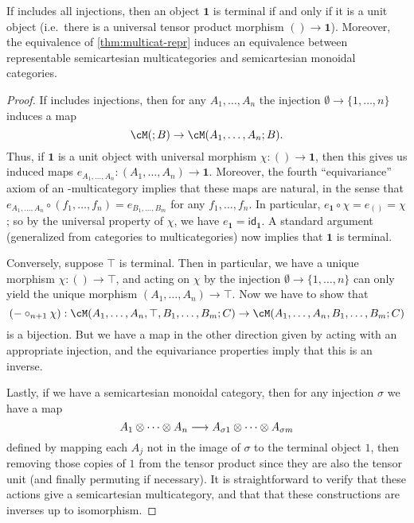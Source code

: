 \documentclass{book}
\def\idfunc{\mathsf{id}}
\def\unit{\top}%
\def\one{\mathbf{1}}
\let\tensor\otimes
\begin{document}
\begin{thm}\label{thm:semicart-multicat-repr}
  If \fS includes all injections, then an object $\one$ is terminal if and only if it is a unit object (i.e.\ there is a universal tensor product morphism $()\to \one$).
  Moreover, the equivalence of \cref{thm:multicat-repr} induces an equivalence between representable semicartesian multicategories and semicartesian monoidal categories.
\end{thm}
\begin{proof}
  If \fS includes injections, then for any $A_1,\dots,A_n$ the injection $\emptyset \to \{1,\dots,n\}$ induces a map
  \[ \cM(;B) \to \cM(A_1,\dots,A_n;B). \]
  Thus, if $\one$ is a unit object with universal morphism $\chi:()\to \one$, then this gives us induced maps $e_{A_1,\dots,A_n}:(A_1,\dots,A_n) \to \one$.
  Moreover, the fourth ``equivariance'' axiom of an \fS-multicategory implies that these maps are natural, in the sense that
  $e_{A_1,\dots,A_n} \circ (f_1,\dots,f_n) = e_{B_1,\dots,B_m}$ for any $f_1,\dots,f_n$.
  In particular, $e_{\one} \circ \chi = e_{()} = \chi$; so by the universal property of $\chi$, we have $e_{\one} = \idfunc_{\one}$.
  A standard argument (generalized from categories to multicategories) now implies that $\one$ is terminal.

  Conversely, suppose $\unit$ is terminal.
  Then in particular, we have a unique morphism $\chi : ()\to \unit$, and acting on $\chi$ by the injection $\emptyset \to \{1,\dots,n\}$ can only yield the unique morphism $(A_1,\dots,A_n)\to \unit$.
  Now we have to show that
  \[ (-\circ_{n+1} \chi) : \cM(A_1,\dots,A_n,\unit,B_1,\dots,B_m; C) \to \cM(A_1,\dots,A_n,B_1,\dots,B_m; C) \]
  is a bijection.
  But we have a map in the other direction given by acting with an appropriate injection, and the equivariance properties imply that this is an inverse.

  Lastly, if we have a semicartesian monoidal category, then for any injection $\sigma$ we have a map
  \[ A_1\tensor \cdots\tensor A_n \too A_{\sigma 1} \tensor\dots\tensor A_{\sigma m} \]
  defined by mapping each $A_j$ not in the image of $\sigma$ to the terminal object $1$, then removing those copies of $1$ from the tensor product since they are also the tensor unit (and finally permuting if necessary).
  It is straightforward to verify that these actions give a semicartesian multicategory, and that that these constructions are inverses up to isomorphism.
\end{proof}
\end{document}
